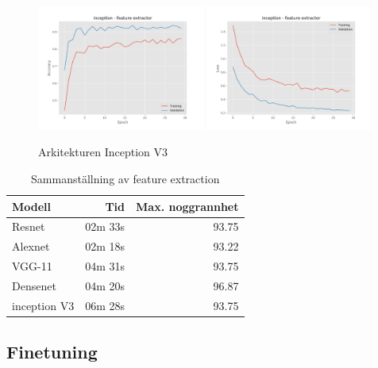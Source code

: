 \documentclass{kththesis}
\begin{document}
    \begin{figure}
      \centering
      \includegraphics[width=0.49\textwidth]{"./room/room-classification - acc - inception - feature extractor"}
      \includegraphics[width=0.49\textwidth]{"./room/room-classification - loss - inception - feature extractor"}
      \caption{Arkitekturen Inception V3}
    \end{figure}
    \begin{table}
      \centering
      \begin{tabular}{|l|r|r|}
        Modell & Tid & Max. noggrannhet \\ 
        \hline
        Resnet       & 02m 33s & 93.75 \\
        Alexnet      & 02m 18s & 93.22 \\
        VGG-11       & 04m 31s & 93.75 \\
        Densenet     & 04m 20s & 96.87 \\
        inception V3 & 06m 28s & 93.75 \\
      \end{tabular}
      \caption{Sammanställning av feature extraction} \label{tab:sometab}
    \end{table}

    \subsection{Finetuning}
\end{document}
